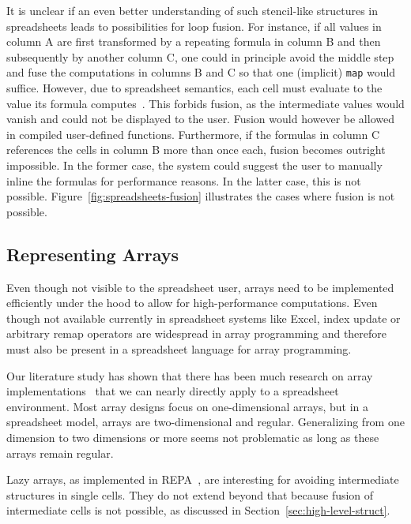 \documentclass[a4paper]{article}
\begin{document}
It is unclear if an even better understanding of such stencil-like structures in spreadsheets leads to possibilities for loop fusion. For instance, if all values in column A are first transformed by a repeating formula in column B and then subsequently by another column C, one could in principle avoid the middle step and fuse the computations in columns B and C so that one (implicit) \texttt{map} would suffice. However, due to spreadsheet semantics, each cell must evaluate to the value its formula computes~\cite{Sestoft2014Spreadsheet}. This forbids fusion, as the intermediate values would vanish and could not be displayed to the user. Fusion would however be allowed in compiled user-defined functions. Furthermore, if the formulas in column C references the cells in column B more than once each, fusion becomes outright impossible. In the former case, the system could suggest the user to manually inline the formulas for performance reasons. In the latter case, this is not possible. Figure~\ref{fig:spreadsheets-fusion} illustrates the cases where fusion is not possible.

\subsection{Representing Arrays}
\label{sec:representing-arrays}

Even though not visible to the spreadsheet user, arrays need to be implemented efficiently under the hood to allow for high-performance computations. Even though not available currently in spreadsheet systems like Excel, index update or arbitrary remap operators are widespread in array programming and therefore must also be present in a spreadsheet language for array programming.

Our literature study has shown that there has been much research on array implementations~\cite{47507, Keller:2010:RSP:1863543.1863582, Stucki:2015:RVP:2784731.2784739} that we can nearly directly apply to a spreadsheet environment. Most array designs focus on one-dimensional arrays, but in a spreadsheet model, arrays are two-dimensional and regular. Generalizing from one dimension to two dimensions or more seems not problematic as long as these arrays remain regular.

Lazy arrays, as implemented in REPA~\cite{Keller:2010:RSP:1863543.1863582}, are interesting for avoiding intermediate structures in single cells. They do not extend beyond that because fusion of intermediate cells is not possible, as discussed in Section~\ref{sec:high-level-struct}.
\end{document}

